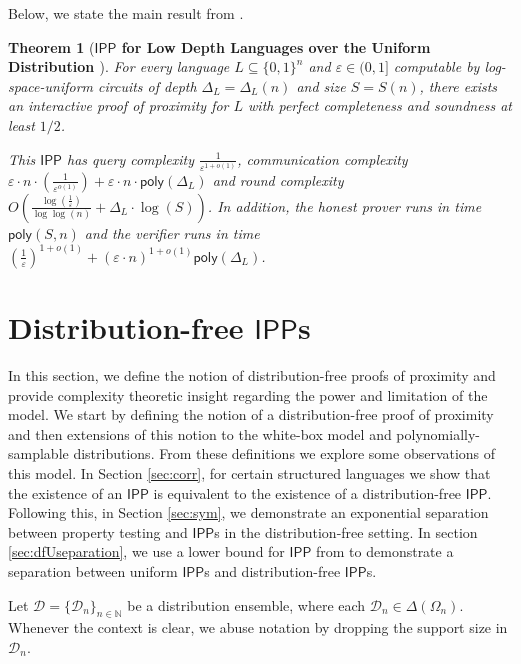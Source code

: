 \documentclass[10pt,a4paper]{article}
\newtheorem{theorem}{Theorem}[section]
\newcommand{\poly}{\mathsf{poly}}
\newcommand{\IPP}{\mathsf{IPP}}
\newcommand{\N}{\mathbb{N}}
\newcommand{\sD}{\mathcal{D}}
\begin{document}
\noindent Below, we state the main result from \cite{RVW}.
\begin{theorem}[\textbf{$\IPP$ for Low Depth Languages over the Uniform Distribution \cite{RVW}}]
\label{thm:unifRVW}
For every language $L\subseteq \{0,1\}^{n}$ and $\varepsilon\in (0,1]$ computable by log-space-uniform circuits of depth $\Delta_{L}=\Delta_{L}(n)$ and size $S=S(n)$, there exists an interactive proof of proximity for $L$ with perfect completeness and soundness at least $1/2$. 

This $\IPP$ has query complexity $\frac{1}{\varepsilon ^{1+o(1)}}$, communication complexity $\varepsilon\cdot n\cdot \left(\frac{1}{\varepsilon^{o(1)}}\right)+\varepsilon\cdot n\cdot \poly(\Delta_{L})$ and round complexity $O\left(\frac{\log\left(\frac{1}{\varepsilon}\right)}{\log\log (n)}+\Delta_{L}\cdot\log (S)\right)$. In addition, the honest prover runs in time $\poly(S,n)$ and the verifier runs in time $(\frac{1}{\varepsilon})^{1+o(1)}+(\varepsilon\cdot n)^{1+o(1)} \poly(\Delta_{L})$.
\end{theorem}

\section{Distribution-free $\IPP$s}
\label{sec:dfipp_def_separations}

In this section, we define the notion of distribution-free proofs of proximity and provide complexity theoretic insight regarding the power and limitation of the model. We start by defining the notion of a distribution-free proof of proximity and then extensions of this notion to the white-box model and polynomially-samplable distributions.  From these definitions we explore some observations of this model. In Section \ref{sec:corr}, for certain structured languages we show that the existence of an $\IPP$ is equivalent to the existence of a distribution-free $\IPP$. Following this, in Section \ref{sec:sym}, we demonstrate an exponential separation between property testing and $\IPP$s in the distribution-free setting. In section \ref{sec:dfUseparation}, we use a lower bound for $\IPP$ from \cite{KR15} to demonstrate a separation between uniform $\IPP$s and distribution-free $\IPP$s.

Let $\sD = \{\sD_n\}_{n \in \N}$ be a distribution ensemble, where each $\sD_n \in \Delta(\Omega_n)$. Whenever the context is clear, we abuse notation by dropping the support size in $\sD_n$. 
\end{document}
